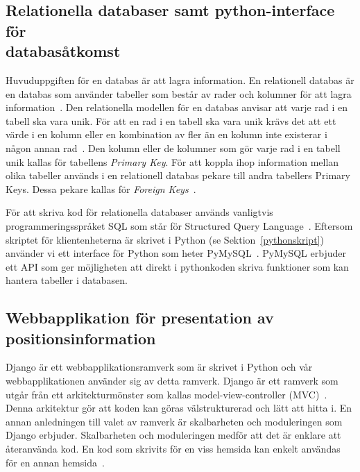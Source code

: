 \documentclass[a4paper,12pt]{article}
\begin{document}
\subsection{Relationella databaser samt python-interface för \\databasåtkomst} \label{relationella_databaser}
Huvuduppgiften för en databas är att lagra information. En relationell databas är en databas som använder tabeller som består av rader och kolumner för att lagra information~\cite{database_fundamentals}. Den relationella modellen för en databas anvisar att varje rad i en tabell ska vara unik. För att en rad i en tabell ska vara unik krävs det att ett värde i en kolumn eller en kombination av fler än en kolumn inte existerar i någon annan rad~\cite{database_fundamentals}. Den kolumn eller de kolumner som gör varje rad i en tabell unik kallas för tabellens \textit{Primary Key}.
För att koppla ihop information mellan olika tabeller används i en relationell databas pekare till andra tabellers Primary Keys. Dessa pekare kallas för \textit{Foreign Keys}~\cite{database_fundamentals}.

För att skriva kod för relationella databaser används vanligtvis programmeringsspråket SQL som står för Structured Query Language~\cite{sql}.
Eftersom skriptet för klientenheterna är skrivet i Python (se Sektion~\ref{pythonskript}) använder vi ett interface för Python som heter PyMySQL~\cite{pymysql}. PyMySQL erbjuder ett API som ger möjligheten att direkt i pythonkoden skriva funktioner som kan hantera tabeller i databasen.


 \subsection{Webbapplikation för presentation av positionsinformation}\label{django}
 Django är ett webbapplikationsramverk som är skrivet i Python och vår webbapplikationen använder sig av detta ramverk. Django är ett ramverk som utgår från ett arkitekturmönster som kallas model-view-controller (MVC)~\cite{djangoMVC}. Denna arkitektur gör att koden kan göras välstrukturerad och lätt att hitta i. En annan anledningen till valet av ramverk är skalbarheten och moduleringen som Django erbjuder. Skalbarheten och moduleringen medför att det är enklare att återanvända kod. En kod som skrivits för en viss hemsida kan enkelt användas för en annan hemsida~\cite{djangoMVC}.
\end{document}
